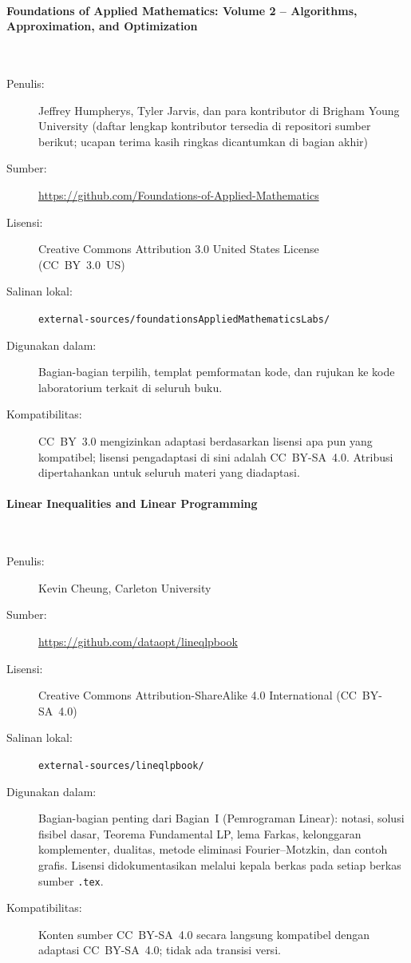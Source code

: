 \paragraph{Foundations of Applied Mathematics: Volume 2 -- Algorithms,
  Approximation, and Optimization}\hspace{0pt}\\[-0.6em]
\begin{description}
  \item[Penulis:] Jeffrey Humpherys, Tyler Jarvis, dan para kontributor di
    Brigham Young University (daftar lengkap kontributor tersedia di repositori
    sumber berikut; ucapan terima kasih ringkas dicantumkan di bagian akhir)
  \item[Sumber:] \url{https://github.com/Foundations-of-Applied-Mathematics}
  \item[Lisensi:] Creative Commons Attribution 3.0 United States License
    (CC~BY~3.0~US)
  \item[Salinan lokal:] \texttt{external-sources/foundationsAppliedMathematicsLabs/}
  \item[Digunakan dalam:] Bagian-bagian terpilih, templat pemformatan kode,
    dan rujukan ke kode laboratorium terkait di seluruh buku.
  \item[Kompatibilitas:] CC~BY~3.0 mengizinkan adaptasi berdasarkan lisensi
    apa pun yang kompatibel; lisensi pengadaptasi di sini adalah CC~BY-SA~4.0.
    Atribusi dipertahankan untuk seluruh materi yang diadaptasi.
\end{description}

\paragraph{Linear Inequalities and Linear Programming}\hspace{0pt}\\[-0.6em]
\begin{description}
  \item[Penulis:] Kevin Cheung, Carleton University
  \item[Sumber:] \url{https://github.com/dataopt/lineqlpbook}
  \item[Lisensi:] Creative Commons Attribution-ShareAlike 4.0
    International (CC~BY-SA~4.0)
  \item[Salinan lokal:] \texttt{external-sources/lineqlpbook/}
  \item[Digunakan dalam:] Bagian-bagian penting dari Bagian~I (Pemrograman
    Linear): notasi, solusi fisibel dasar, Teorema Fundamental LP, lema
    Farkas, kelonggaran komplementer, dualitas, metode eliminasi
    Fourier--Motzkin, dan contoh grafis. Lisensi didokumentasikan melalui
    kepala berkas pada setiap berkas sumber \texttt{.tex}.
  \item[Kompatibilitas:] Konten sumber CC~BY-SA~4.0 secara langsung
    kompatibel dengan adaptasi CC~BY-SA~4.0; tidak ada transisi versi.
\end{description}

